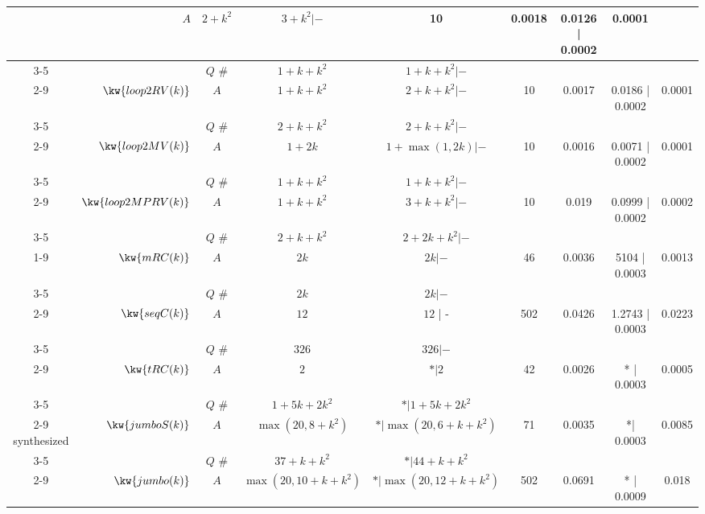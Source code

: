 \begin {table}[H]
\begin{center}
{\begin{tabular}{ | >{\tiny}c| r | >{\tiny}c | c | c | c | c | c | c | }
         & $A$ & $2 + k^2$ &   $3 + k^2| -$    &  10 & 0.0018 & 0.0126 | 0.0002 & 0.0001  \\
         \cline{3-5}
         & & $Q$ \#   & $1 + k + k^2$ & $1 + k + k^2|- $ & & & & \\
         \cline{2-9}
         & $\kw{loop2RV(k)}$ 
         & $A$ & $1 + k + k^2$ &  $ 2 + k +  k^2 | -$   &  10 & 0.0017 & 0.0186 | 0.0002 & 0.0001  \\
         \cline{3-5}
         & & $Q$ \#   & {$2 + k + k^2$} &  $2 + k + k^2| -$ & & & & \\
         \cline{2-9}
         & $\kw{loop2MV(k)}$ 
         & $A$ & $1 + 2k $ & $1 + \max(1,2k) | -$  & 10 & 0.0016 & 0.0071 | 0.0002 & 0.0001 \\
         \cline{3-5}
         & & $Q$ \#   & {$1 + k + k^2$} &  $1 + k + k^2 |-$  & & & & \\
         \cline{2-9}
         & \multirow{2}{*}{$\kw{loop2MPRV(k)}$}
         & $A$  &  $1 + k + k^2$ &  $3 + k + k^2| -$  &  10 & 0.019 & 0.0999 | 0.0002 & 0.0002 \\
         \cline{3-5}
         & & $Q$ \#   & $2 + k + k^2 $ & $2 + 2k + k^2 | - $  & & & & \\
         \cline{1-9}
         & $\kw{mRC(k)}$ 
         & $A$ & $2k$ & $  2k | -$   &  46 & 0.0036 & 5104 | 0.0003 &  0.0013\\
         \cline{3-5}
         & & $Q$ \#   & {$2k$} & $ 2k | -$   & & & & \\
         \cline{2-9}
         & $\kw{seqC(k)}$ 
         & $A$ & $12$ & $12  $ | -  &  502 & 0.0426  & 1.2743 | 0.0003 & 0.0223 \\
         \cline{3-5}
         & & $Q$ \#   & $326$ & $326 | -$   & & & & \\
         \cline{2-9}
         & \multirow{2}{*}{$\kw{tRC(k)}$} 
         & $A$ & $2$ &  $ * | 2$   &  42 & 0.0026 & * | 0.0003 & 0.0005\\
         \cline{3-5}
         & & $Q$ \#   & $1 + 5k + 2 k^2 $ & $* | 1 + 5k + 2 k^2 $  & & & & \\
         \cline{2-9}
         synthesized
         & \multirow{2}{*}{$\kw{{jumboS(k)}}$}
         & $A$ & $ \max(20, 8+k^2)$ &  {$ * | \max(20, 6+k+k^2)$}    &  71 & 0.0035 & *| 0.0003 &  0.0085 \\
         \cline{3-5}
         & & $Q$ \#   & $37+k+k^2 $ & $* | {44+k+k^2}$  & & & & \\
         \cline{2-9}
         & \multirow{2}{*}{$\kw{jumbo(k)}$}
         & $A$ & $ \max(20, 10+k+k^2 )$    &  $* | \max(20, 12 + k+ k^2)$   &  502 & 0.0691 & * | 0.0009 & 0.018 \\

\end{tabular}}
\end{center}
\end{table}
